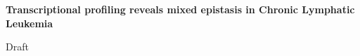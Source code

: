 
\begin{titlepage}
	\centering
	{\LARGE \bfseries Transcriptional profiling reveals mixed epistasis in Chronic Lymphatic Leukemia \par}
	\vspace{5cm}
	{\normalsize Draft \par}
	\vspace{4cm}
	\vspace{0.25cm}
\end{titlepage}


